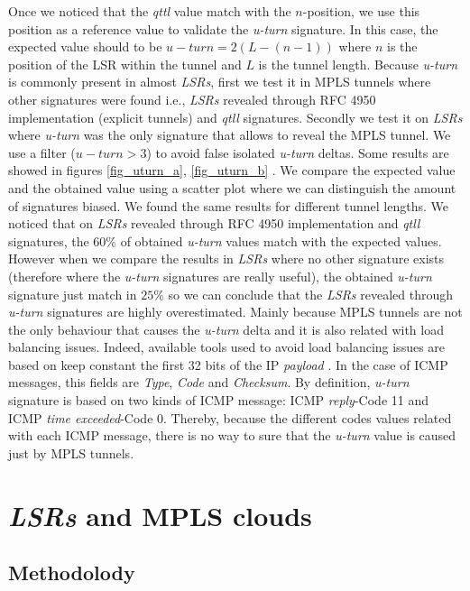 Once we noticed that the \textit{qttl} value match with the $n$-position, we use this position as a reference value to validate the \textit{u-turn} signature. In this case, the expected value should to be $u-turn=2(L-(n-1))$ where $n$ is the position of the LSR within the tunnel and $L$ is the tunnel length. Because \textit{u-turn} is commonly present in almost \textit{LSRs}, first we test it in MPLS tunnels  where other signatures were found i.e., \textit{LSRs} revealed through RFC 4950 implementation (explicit tunnels) and \textit{qtll} signatures. Secondly we test it on \textit{LSRs} where \textit{u-turn} was the only signature that allows to reveal the MPLS tunnel. We use a filter ($u-turn>3$) to avoid false isolated \textit{u-turn} deltas. Some results are showed in figures \ref{fig_uturn_a}, \ref{fig_uturn_b} . We compare the expected value and the obtained value using a scatter plot where we can distinguish the amount of signatures biased. We found the same results for different tunnel lengths. We noticed that on \textit{LSRs} revealed through RFC 4950 implementation and \textit{qtll} signatures, the $60\%$ of obtained \textit{u-turn} values match with the expected values. However when we compare the results in \textit{LSRs} where no other signature exists (therefore where the \textit{u-turn} signatures are really useful), the obtained \textit{u-turn} signature just match in $25\%$  so we can conclude that the \textit{LSRs} revealed through \textit{u-turn} signatures are highly overestimated. Mainly because MPLS tunnels are not the only behaviour that causes the \textit{u-turn} delta  and it is also related with load balancing issues. Indeed, available tools used to avoid load balancing issues are based on keep constant the first 32 bits of the IP \textit{payload} \cite{BRICE06}. In the case of ICMP messages, this fields are \textit{Type}, \textit{Code} and \textit{Checksum}. By definition, \textit{u-turn} signature is based on two kinds of ICMP message: ICMP \textit{reply}-Code 11 and ICMP \textit{time exceeded}-Code 0. Thereby, because the different codes values related with each ICMP message, there is no way to sure that the \textit{u-turn} value is caused just by MPLS tunnels.


\section{\textit{LSRs} and MPLS clouds}

\subsection{Methodolody}

